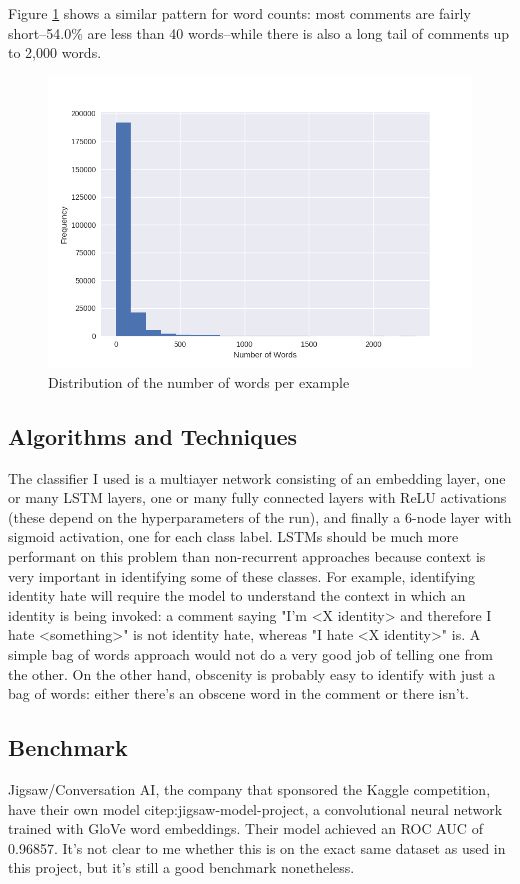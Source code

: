\documentclass[12pt]{article}
\begin{document}
Figure \ref{fig:word-dist} shows a similar pattern for word counts: most comments are fairly short--54.0\% are less than 40 words--while there is also a long tail of comments up to 2,000 words.
\begin{figure}
\centering
\includegraphics[width=\textwidth]{word_counts}
\caption{Distribution of the number of words per example}
\label{fig:word-dist}
\end{figure}

\subsection*{Algorithms and Techniques}
\label{sec:org11b7dde}
The classifier I used is a multiayer network consisting of an embedding layer, one or many LSTM layers, one or many fully connected layers with ReLU activations (these depend on the hyperparameters of the run), and finally a 6-node layer with sigmoid activation, one for each class label. LSTMs should be much more performant on this problem than non-recurrent approaches because context is very important in identifying some of these classes. For example, identifying identity hate will require the model to understand the context in which an identity is being invoked: a comment saying "I'm <X identity> and therefore I hate <something>" is not identity hate, whereas "I hate <X identity>" is. A simple bag of words approach would not do a very good job of telling one from the other. On the other hand, obscenity is probably easy to identify with just a bag of words: either there's an obscene word in the comment or there isn't.

\subsection*{Benchmark}
\label{sec:org6391af7}
Jigsaw/Conversation AI, the company that sponsored the Kaggle competition, have their own model citep:jigsaw-model-project, a convolutional neural network trained with GloVe word embeddings. Their model achieved an ROC AUC of 0.96857. It's not clear to me whether this is on the exact same dataset as used in this project, but it's still a good benchmark nonetheless.
\end{document}
